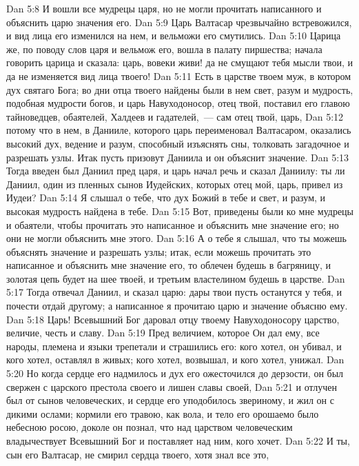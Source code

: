 \vs Dan 5:8 И вошли все мудрецы царя, но не могли прочитать написанного и объяснить царю значения его.
\vs Dan 5:9 Царь Валтасар чрезвычайно встревожился, и вид лица его изменился на нем, и вельможи его смутились.
\vs Dan 5:10 Царица же, по поводу слов царя и вельмож его, вошла в палату пиршества; начала говорить царица и сказала: царь, вовеки живи! да не смущают тебя мысли твои, и да не изменяется вид лица твоего!
\vs Dan 5:11 Есть в царстве твоем муж, в котором дух святаго Бога; во дни отца твоего найдены были в нем свет, разум и мудрость, подобная мудрости богов, и царь Навуходоносор, отец твой, поставил его главою тайноведцев, обаятелей, Халдеев и гадателей,~--- сам отец твой, царь,
\vs Dan 5:12 потому что в нем, в Данииле, которого царь переименовал Валтасаром, оказались высокий дух, ведение и разум, способный изъяснять сны, толковать загадочное и разрешать узлы. Итак пусть призовут Даниила и он объяснит значение.
\vs Dan 5:13 Тогда введен был Даниил пред царя, и царь начал речь и сказал Даниилу: ты ли Даниил, один из пленных сынов Иудейских, которых отец мой, царь, привел из Иудеи?
\vs Dan 5:14 Я слышал о тебе, что дух Божий в тебе и свет, и разум, и высокая мудрость найдена в тебе.
\vs Dan 5:15 Вот, приведены были ко мне мудрецы и обаятели, чтобы прочитать это написанное и объяснить мне значение его; но они не могли объяснить мне этого.
\vs Dan 5:16 А о тебе я слышал, что ты можешь объяснять значение и разрешать узлы; итак, если можешь прочитать это написанное и объяснить мне значение его, то облечен будешь в багряницу, и золотая цепь будет на шее твоей, и третьим властелином будешь в царстве.
\vs Dan 5:17 Тогда отвечал Даниил, и сказал царю: дары твои пусть останутся у тебя, и почести отдай другому; а написанное я прочитаю царю и значение объясню ему.
\rsbpar\vs Dan 5:18 Царь! Всевышний Бог даровал отцу твоему Навуходоносору царство, величие, честь и славу.
\vs Dan 5:19 Пред величием, которое Он дал ему, все народы, племена и языки трепетали и страшились его: кого хотел, он убивал, и кого хотел, оставлял в живых; кого хотел, возвышал, и кого хотел, унижал.
\vs Dan 5:20 Но когда сердце его надмилось и дух его ожесточился до дерзости, он был свержен с царского престола своего и лишен славы своей,
\vs Dan 5:21 и отлучен был от сынов человеческих, и сердце его уподобилось звериному, и жил он с дикими ослами; кормили его травою, как вола, и тело его орошаемо было небесною росою, доколе он познал, что над царством человеческим владычествует Всевышний Бог и поставляет над ним, кого хочет.
\vs Dan 5:22 И ты, сын его Валтасар, не смирил сердца твоего, хотя знал все это,
